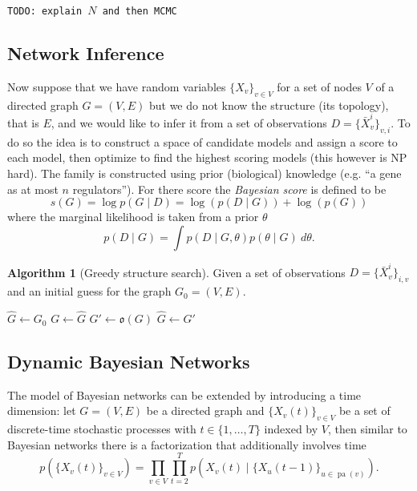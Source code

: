 \documentclass[a4paper]{article}
\newcommand{\todo}[1]{\texttt{TODO: #1}}
\newcommand{\given}{\mid}
\DeclareMathOperator{\pa}{pa} %
\theoremstyle{plain}
\theoremstyle{definition}
\newtheorem{alg}{Algorithm}[section]
\theoremstyle{remark}
\begin{document}
\todo{explain $N$ and then MCMC}

\subsection{Network Inference}

Now suppose that we have random variables $\{X_v\}_{v \in V}$ for a set of
nodes $V$ of a directed graph $G = (V,E)$ but we do not know the structure
(its topology), that is $E$, and we would like to infer it from a set of
observations $D = \{\bar{X}_v^i\}_{v,i}$. To do so the idea is to construct a
space of candidate models and assign a score to each model, then optimize to
find the highest scoring models (this however is NP hard). The family is
constructed using prior (biological) knowledge (e.g. ``a gene as at most $n$
regulators''). For there score the \emph{Bayesian score} is defined to be
\[
  s(G) = \log p(G \given D) = \log(p(D \given G)) + \log(p(G))
\]
where the marginal likelihood is taken from a prior $\theta$
\[
  p(D \given G) = \int p(D \given G, \theta) p(\theta \given G) ~ d\theta.
\]

\begin{alg}[Greedy structure search]
  Given a set of observations $D = \{\bar{X}_v^i\}_{i,v}$ and an initial guess
  for the graph $G_0 = (V,E)$.
  \begin{algorithmic}
      \State $\hat{G} \gets G_0$
      \Repeat
        \State $G \gets \hat{G}$
        \State {}
          \State $G' \gets \mathfrak{o}(G)$
              \State $\hat{G} \gets G'$
            \EndIf
          \EndIf
        \EndFor
    \EndFunction
  \end{algorithmic}
\end{alg}

\subsection{Dynamic Bayesian Networks}

The model of Bayesian networks can be extended by introducing a time
dimension: let $G = (V,E)$ be a directed graph and $\{X_v(t)\}_{v\in V}$ be a
set of discrete-time stochastic processes with $t \in \{1,\ldots, T\}$ indexed
by $V$, then similar to Bayesian networks there is a factorization that
additionally involves time
\[
  p(\{X_v(t)\}_{v \in V})
    = \prod_{v \in V} \prod_{t=2}^T p(X_v(t) \given 
      \{X_u(t-1)\}_{u \in \pa(v)}).
\]
\end{document}
